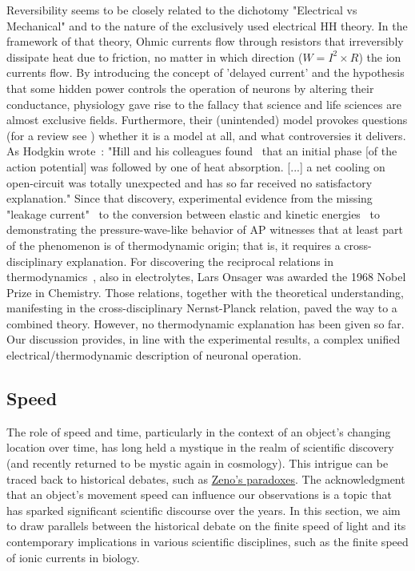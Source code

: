 Reversibility seems to be
closely related to the dichotomy "Electrical vs Mechanical"
and to the nature of the exclusively used electrical
\gls{HH} theory. In the framework of that
theory, Ohmic currents flow through resistors that irreversibly dissipate heat due to
friction, no matter in which direction ($W=I^2\times R$) the ion currents flow. 
By introducing the concept of
'delayed current' and the hypothesis that some hidden power controls the operation
of neurons by altering their conductance, physiology gave rise to the fallacy that science and life sciences are almost exclusive fields.
Furthermore, their (unintended) model provokes questions (for a review
see \cite{HH_Potential_Controversies_2017}) whether it is a model
at all, and what controversies it delivers.  
As Hodgkin wrote~\cite{HodgkinConduction:1964}: "Hill and his colleagues found~\cite{HeatProductionNeuron:1958} that an initial phase [of the action potential] was followed by one of
heat absorption. [...] a net cooling on open-circuit was totally unexpected
and has so far received no satisfactory explanation."
Since that discovery, experimental evidence from the missing "leakage current"~\cite{EnergyNeuralCommunication:2021} to the conversion between
elastic and kinetic energies~\cite{MechanicalWaves:2015} to demonstrating 
the pressure-wave-like behavior of \gls{AP} witnesses that 
at least part of the phenomenon is of thermodynamic origin;
that is, it requires a cross-disciplinary explanation.
For discovering the reciprocal relations in thermodynamics~\cite{OnsagerExperimental:1959}, also in electrolytes, Lars Onsager was awarded the 1968 Nobel Prize in Chemistry.
Those relations, together with the theoretical understanding,
manifesting in the cross-disciplinary Nernst-Planck relation,
paved the way to a combined theory.
However, no thermodynamic explanation has been given so far.
Our discussion provides, in line with the experimental results,
a complex unified electrical/thermodynamic description of neuronal operation.



\subsection{Speed\label{sec:Physics-Speeds}}

The role of speed and time, particularly in
the context of an object's changing location over time, has long held
a mystique in the realm of scientific discovery (and recently returned
to be mystic again in cosmology). This intrigue can
be traced back to historical debates, such as \href{https://en.wikipedia.org/wiki/Zeno's_paradoxes}{Zeno's paradoxes}. The
acknowledgment that an object's movement speed can influence our
observations is a topic that has sparked significant scientific discourse
over the years. In this section, we aim to draw parallels between
the historical debate on the finite speed of light and its contemporary
implications in various scientific disciplines, such as the finite
speed of ionic currents in biology.

